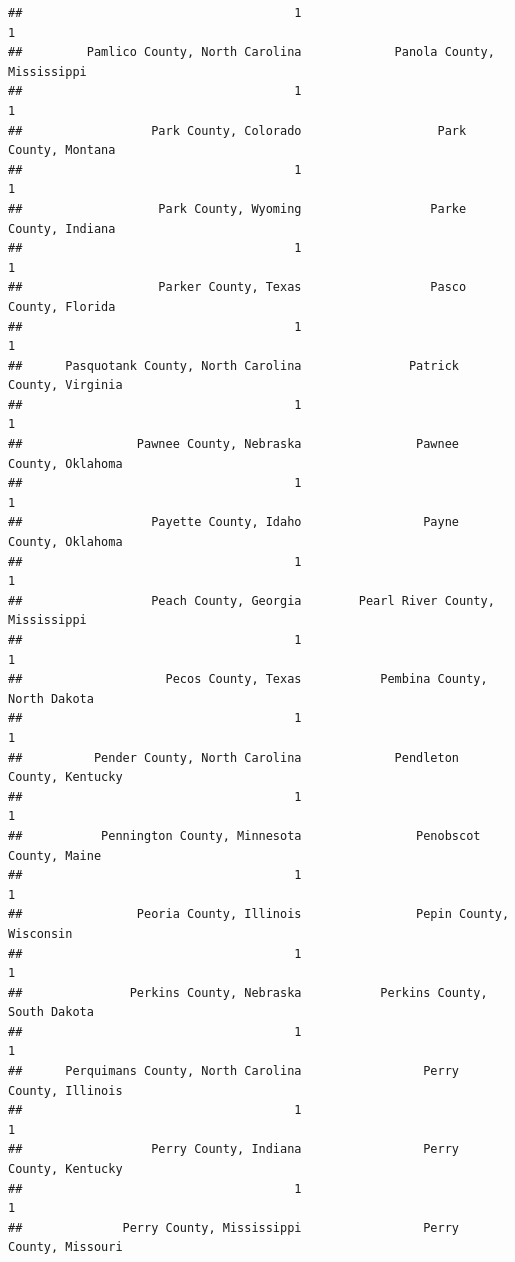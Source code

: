 \documentclass[
]{article}
\begin{document}
\begin{verbatim}
##                                      1                                      1 
##         Pamlico County, North Carolina             Panola County, Mississippi 
##                                      1                                      1 
##                  Park County, Colorado                   Park County, Montana 
##                                      1                                      1 
##                   Park County, Wyoming                  Parke County, Indiana 
##                                      1                                      1 
##                   Parker County, Texas                  Pasco County, Florida 
##                                      1                                      1 
##      Pasquotank County, North Carolina               Patrick County, Virginia 
##                                      1                                      1 
##                Pawnee County, Nebraska                Pawnee County, Oklahoma 
##                                      1                                      1 
##                  Payette County, Idaho                 Payne County, Oklahoma 
##                                      1                                      1 
##                  Peach County, Georgia        Pearl River County, Mississippi 
##                                      1                                      1 
##                    Pecos County, Texas           Pembina County, North Dakota 
##                                      1                                      1 
##          Pender County, North Carolina             Pendleton County, Kentucky 
##                                      1                                      1 
##           Pennington County, Minnesota                Penobscot County, Maine 
##                                      1                                      1 
##                Peoria County, Illinois                Pepin County, Wisconsin 
##                                      1                                      1 
##               Perkins County, Nebraska           Perkins County, South Dakota 
##                                      1                                      1 
##      Perquimans County, North Carolina                 Perry County, Illinois 
##                                      1                                      1 
##                  Perry County, Indiana                 Perry County, Kentucky 
##                                      1                                      1 
##              Perry County, Mississippi                 Perry County, Missouri 

\end{verbatim}
\end{document}
